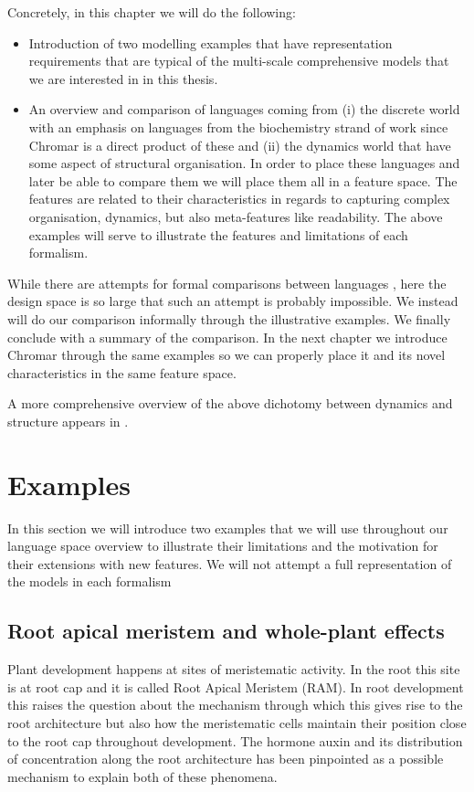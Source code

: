 \documentclass[phd]{infthesis}
\begin{document}
Concretely, in this chapter we will do the following:
\begin{itemize}

\item Introduction of two modelling examples that have representation
  requirements that are typical of the multi-scale comprehensive models that we
  are interested in in this thesis.
\item An overview and comparison of languages coming from (i) the discrete world
  with an emphasis on languages from the biochemistry strand of work since
  Chromar is a direct product of these and (ii) the dynamics world that have
  some aspect of structural organisation. In order to place these languages and
  later be able to compare them we will place them all in a feature space. The
  features are related to their characteristics in regards to capturing complex
  organisation, dynamics, but also meta-features like readability. The above
  examples will serve to illustrate the features and limitations of each formalism.
\end{itemize}
While there are attempts for formal comparisons between languages
\citep{felleisen1991expressive}, here the design space is so large that such an
attempt is probably impossible. We instead will do our comparison informally
through the illustrative examples. We finally conclude with a summary of the
comparison. In the next chapter we introduce Chromar through the same examples
so we can properly place it and its novel characteristics in the same feature
space.

A more comprehensive overview of the above dichotomy between dynamics and
structure appears in \citet{fontana1996barrier}.

\section{Examples}
\label{sec:examples}
In this section we will introduce two examples that we will use throughout our
language space overview to illustrate their limitations and the motivation
for their extensions with new features. We will not attempt a full
representation of the models in each formalism

\subsection{Root apical meristem and whole-plant effects}
\label{subsec:rootDev}
Plant development happens at sites of meristematic activity. In the root this
site is at root cap and it is called Root Apical Meristem (RAM). In root
development this raises the question about the mechanism through which this gives
rise to the root architecture but also how the meristematic cells maintain their
position close to the root cap throughout development. The hormone auxin and its
distribution of concentration along the root architecture has been pinpointed as
a possible mechanism to explain both of these phenomena.
\end{document}
